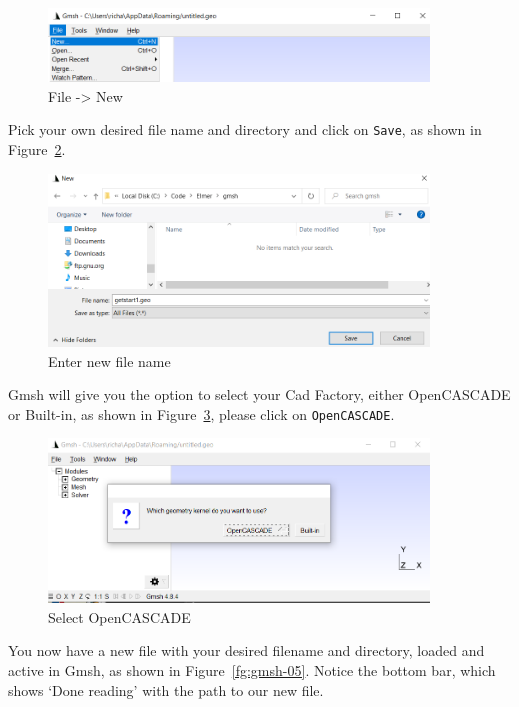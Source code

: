 \begin{figure}[H]
\centering
\includegraphics[width=0.9\textwidth]{gmsh-02}
\caption{File -> New}\label{fg:gmsh-02}
\end{figure}

Pick your own desired file name and directory and click on \texttt{Save}, as shown in Figure~\ref{fg:gmsh-03}.

\begin{figure}[H]
\centering
\includegraphics[width=0.9\textwidth]{gmsh-03}
\caption{Enter new file name}\label{fg:gmsh-03}
\end{figure}

Gmsh will give you  the option to select your Cad Factory, either OpenCASCADE or Built-in, as shown in Figure~\ref{fg:gmsh-04}, please click on \texttt{OpenCASCADE}.

\begin{figure}[H]
\centering
\includegraphics[width=0.9\textwidth]{gmsh-04}
\caption{Select OpenCASCADE}\label{fg:gmsh-04}
\end{figure}

\newpage

You now have a new file with your desired filename and directory, loaded and active in Gmsh, as shown in Figure~\ref{fg:gmsh-05}.  Notice the bottom bar, which shows `Done reading' with the path to our new file.

